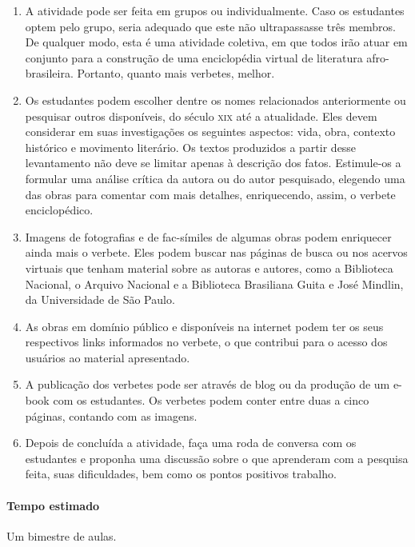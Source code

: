 \documentclass[12pt]{extarticle}
\begin{document}
\begin{enumerate}
\item
A atividade pode ser feita em grupos ou
individualmente. Caso os estudantes optem pelo grupo, seria adequado que
este não ultrapassasse três membros. De qualquer modo, esta é uma
atividade coletiva, em que todos irão atuar em conjunto para a
construção de uma enciclopédia virtual de literatura afro-brasileira.
Portanto, quanto mais verbetes, melhor.

\item
Os estudantes podem escolher dentre os nomes relacionados
anteriormente ou pesquisar outros disponíveis, do século \textsc{xix} até a
atualidade. Eles devem considerar em suas investigações os seguintes
aspectos: vida, obra, contexto histórico e movimento literário. Os
textos produzidos a partir desse levantamento não deve se limitar apenas
à descrição dos fatos. Estimule-os a formular uma análise crítica da
autora ou do autor pesquisado, elegendo uma das obras para comentar com
mais detalhes, enriquecendo, assim, o verbete enciclopédico.

\item
Imagens de fotografias e de fac-símiles de algumas obras podem
enriquecer ainda mais o verbete. Eles podem buscar nas páginas de busca
ou nos acervos virtuais que tenham material sobre as autoras e autores,
como a Biblioteca Nacional, o Arquivo Nacional e a Biblioteca Brasiliana
Guita e José Mindlin, da Universidade de São Paulo.

\item
As obras em domínio público e disponíveis na internet podem ter os
seus respectivos links informados no verbete, o que contribui para o
acesso dos usuários ao material apresentado.

\item
A publicação dos verbetes pode ser através de blog ou da produção de
um e-book com os estudantes. Os verbetes podem conter entre duas a cinco
páginas, contando com as imagens.

\item
Depois de concluída a atividade, faça uma roda de conversa com os
estudantes e proponha uma discussão sobre o que aprenderam com a
pesquisa feita, suas dificuldades, bem como os pontos positivos
trabalho.
\end{enumerate}

\paragraph{Tempo estimado} Um bimestre de aulas.
\end{document}

